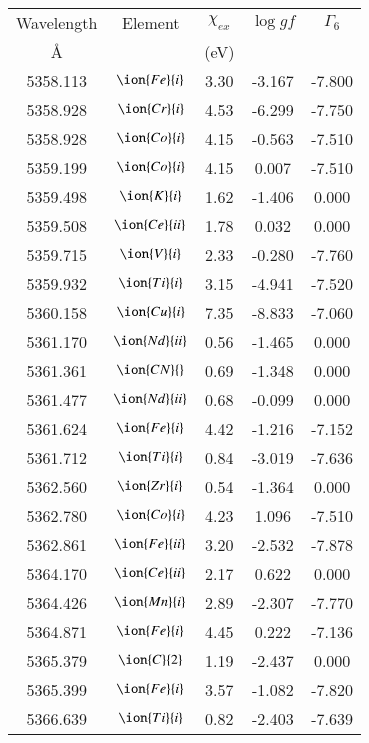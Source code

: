\documentclass[fleqn,usenatbib]{mnras}
\begin{document}
 \begin{center}
 \begin{table}
 \begin{tabular}{ccccc}
 \hline
 Wavelength & Element & $\chi_{ex}$ &  $\log gf$ & $\varGamma_{6}$ \\
   \AA{}    &         &  (eV)       &            &                 \\
 \hline
5358.113 &  $\ion{Fe}{i}$  & 3.30 & -3.167 & -7.800 \\ 
5358.928 &  $\ion{Cr}{i}$  & 4.53 & -6.299 & -7.750 \\ 
5358.928 &  $\ion{Co}{i}$  & 4.15 & -0.563 & -7.510 \\ 
5359.199 &  $\ion{Co}{i}$  & 4.15 & 0.007 & -7.510 \\ 
5359.498 &  $\ion{K}{i}$  & 1.62 & -1.406 & 0.000 \\ 
5359.508 &  $\ion{Ce}{ii}$  & 1.78 & 0.032 & 0.000 \\ 
5359.715 &  $\ion{V}{i}$  & 2.33 & -0.280 & -7.760 \\ 
5359.932 &  $\ion{Ti}{i}$  & 3.15 & -4.941 & -7.520 \\ 
5360.158 &  $\ion{Cu}{i}$  & 7.35 & -8.833 & -7.060 \\ 
5361.170 &  $\ion{Nd}{ii}$  & 0.56 & -1.465 & 0.000 \\ 
5361.361 & $\ion{CN}{}$ & 0.69 & -1.348 & 0.000 \\ 
5361.477 &  $\ion{Nd}{ii}$  & 0.68 & -0.099 & 0.000 \\ 
5361.624 &  $\ion{Fe}{i}$  & 4.42 & -1.216 & -7.152 \\ 
5361.712 &  $\ion{Ti}{i}$  & 0.84 & -3.019 & -7.636 \\ 
5362.560 &  $\ion{Zr}{i}$  & 0.54 & -1.364 & 0.000 \\ 
5362.780 &  $\ion{Co}{i}$  & 4.23 & 1.096 & -7.510 \\ 
5362.861 &  $\ion{Fe}{ii}$  & 3.20 & -2.532 & -7.878 \\ 
5364.170 &  $\ion{Ce}{ii}$  & 2.17 & 0.622 & 0.000 \\ 
5364.426 &  $\ion{Mn}{i}$  & 2.89 & -2.307 & -7.770 \\ 
5364.871 &  $\ion{Fe}{i}$  & 4.45 & 0.222 & -7.136 \\ 
5365.379 &  $\ion{C}{2}$ & 1.19 & -2.437 & 0.000 \\ 
5365.399 &  $\ion{Fe}{i}$  & 3.57 & -1.082 & -7.820 \\ 
5366.639 &  $\ion{Ti}{i}$  & 0.82 & -2.403 & -7.639 \\ 

\end{tabular}
\end{table}
\end{center}
\end{document}
